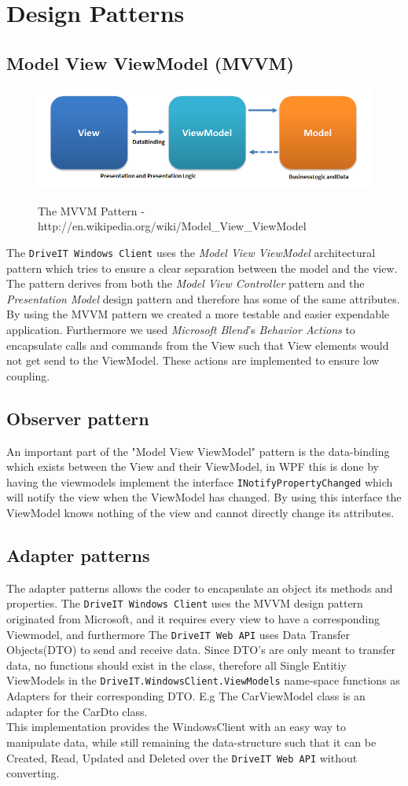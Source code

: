 \section{Design Patterns}
\subsection{Model View ViewModel (MVVM)}
\begin{figure}[H]
	\centering
	\includegraphics[scale=0.6]{Figures/WebImages/MVVMPattern}\\
	\caption{The MVVM Pattern - http://en.wikipedia.org/wiki/Model\_View\_ViewModel}
	\label{fig:MVVMPattern}
\end{figure}
The \texttt{DriveIT Windows Client} uses the \emph{Model View ViewModel} architectural pattern which tries to ensure a clear separation between the model and the view. The pattern derives from both the \emph{Model View Controller} pattern and the \emph{Presentation Model} design pattern and therefore has some of the same attributes. By using the MVVM pattern we created a more testable and easier expendable application. Furthermore we used \emph{Microsoft Blend}'s \emph{Behavior Actions} to encapsulate calls and commands from the View such that View elements would not get send to the ViewModel. These actions are implemented to ensure low coupling.
\subsection{Observer pattern}
An important part of the "Model View ViewModel" pattern is the data-binding which exists between the View and their ViewModel, in WPF this is done by having the viewmodels implement the interface \texttt{INotifyPropertyChanged} which will notify the view when the ViewModel has changed. By using this interface the ViewModel knows nothing of the view and cannot directly change its attributes.
\subsection{Adapter patterns}
The adapter patterns allows the coder to encapsulate an object its methods and properties. The \texttt{DriveIT Windows Client} uses the MVVM design pattern originated from Microsoft, and it requires every view to have a corresponding Viewmodel, and furthermore The \texttt{DriveIT Web API} uses Data Transfer Objects(DTO) to send and receive data. Since DTO's are only meant to transfer data, no functions should exist in the class, therefore all Single Entitiy ViewModels in the \texttt{DriveIT.WindowsClient.ViewModels} name-space functions as Adapters for their corresponding DTO. E.g The CarViewModel class is an adapter for the CarDto class.\\ 

This implementation provides the WindowsClient with an easy way to manipulate data, while still remaining the data-structure such that it can be Created, Read, Updated and Deleted over the \texttt{DriveIT Web API} without converting.
